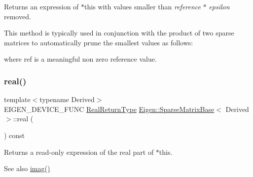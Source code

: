 \begin{DoxyReturn}{Returns}
an expression of {\ttfamily $\ast$this} with values smaller than {\itshape reference} $\ast$ {\itshape epsilon} removed.
\end{DoxyReturn}
This method is typically used in conjunction with the product of two sparse matrices to automatically prune the smallest values as follows\+: 
\begin{DoxyCode}{0}
\end{DoxyCode}
 where {\ttfamily ref} is a meaningful non zero reference value. \mbox{\label{class_eigen_1_1_sparse_matrix_base_a8a21aa3017e094f1c07be866d47d7539}} 
\subsubsection{\texorpdfstring{real()}{real()}\hspace{0.1cm}{\footnotesize\ttfamily [1/2]}}
{\footnotesize\ttfamily template$<$typename Derived$>$ \\
E\+I\+G\+E\+N\+\_\+\+D\+E\+V\+I\+C\+E\+\_\+\+F\+U\+NC \mbox{\hyperlink{struct_eigen_1_1internal_1_1true__type}{Real\+Return\+Type}} \mbox{\hyperlink{class_eigen_1_1_sparse_matrix_base}{Eigen\+::\+Sparse\+Matrix\+Base}}$<$ Derived $>$\+::real (\begin{DoxyParamCaption}{ }\end{DoxyParamCaption}) const\hspace{0.3cm}{\ttfamily [inline]}}

\begin{DoxyReturn}{Returns}
a read-\/only expression of the real part of {\ttfamily $\ast$this}.
\end{DoxyReturn}
\begin{DoxySeeAlso}{See also}
\mbox{\hyperlink{class_eigen_1_1_sparse_matrix_base_aba4d0025dccf8a02d33b76c241e0625a}{imag()}} 
\end{DoxySeeAlso}
\mbox{\label{class_eigen_1_1_sparse_matrix_base_a47a21ed23d5d10618ac0aca93903a32e}} 
